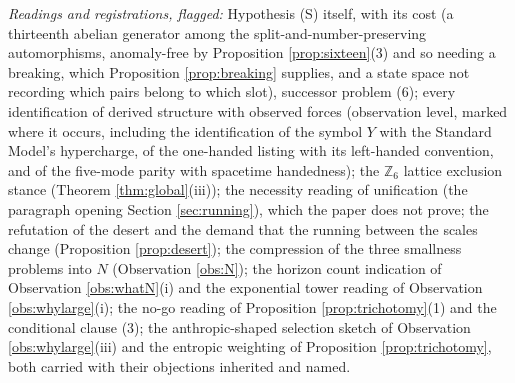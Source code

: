 \documentclass[11pt]{article}
\theoremstyle{definition}
\begin{document}
\emph{Readings and registrations, flagged:} Hypothesis (S) itself, with its cost (a thirteenth abelian generator among the split-and-number-preserving automorphisms, anomaly-free by Proposition \ref{prop:sixteen}(3) and so needing a breaking, which Proposition \ref{prop:breaking} supplies, and a state space not recording which pairs belong to which slot), successor problem (6); every identification of derived structure with observed forces (observation level, marked where it occurs, including the identification of the symbol $Y$ with the Standard Model's hypercharge, of the one-handed listing with its left-handed convention, and of the five-mode parity with spacetime handedness); the $\mathbb{Z}_{6}$ lattice exclusion stance (Theorem \ref{thm:global}(iii)); the necessity reading of unification (the paragraph opening Section \ref{sec:running}), which the paper does not prove; the refutation of the desert and the demand that the running between the scales change (Proposition \ref{prop:desert}); the compression of the three smallness problems into $N$ (Observation \ref{obs:N}); the horizon count indication of Observation \ref{obs:whatN}(i) and the exponential tower reading of Observation \ref{obs:whylarge}(i); the no-go reading of Proposition \ref{prop:trichotomy}(1) and the conditional clause (3); the anthropic-shaped selection sketch of Observation \ref{obs:whylarge}(iii) and the entropic weighting of Proposition \ref{prop:trichotomy}, both carried with their objections inherited and named.
\end{document}

